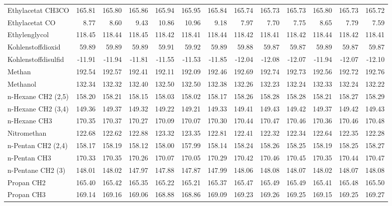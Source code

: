 \begin{table}[ht!]
{\begin{tabular}{lrrrrrrrrrrrr}
    Ethylacetat CH3CO & 165.81 & 165.80 & 165.86 & 165.94 & 165.95 & 165.84 & 165.74 & 165.73 & 165.73 & 165.80 & 165.73 & 165.72 \\
    Ethylacetat CO & 8.77  & 8.60  & 9.43  & 10.86 & 10.96 & 9.18  & 7.97  & 7.70  & 7.75  & 8.65  & 7.79  & 7.59 \\
    Ethylenglycol & 118.45 & 118.44 & 118.45 & 118.42 & 118.41 & 118.44 & 118.42 & 118.41 & 118.42 & 118.44 & 118.42 & 118.41 \\
    Kohlenstoffdioxid & 59.89 & 59.89 & 59.89 & 59.91 & 59.92 & 59.89 & 59.88 & 59.87 & 59.87 & 59.89 & 59.87 & 59.87 \\
    Kohlenstoffdisulfid & -11.91 & -11.94 & -11.81 & -11.55 & -11.53 & -11.85 & -12.04 & -12.08 & -12.07 & -11.94 & -12.07 & -12.10 \\
    Methan & 192.54 & 192.57 & 192.41 & 192.11 & 192.09 & 192.46 & 192.69 & 192.74 & 192.73 & 192.56 & 192.72 & 192.76 \\
    Methanol & 132.34 & 132.32 & 132.40 & 132.50 & 132.50 & 132.38 & 132.26 & 132.23 & 132.24 & 132.33 & 132.24 & 132.22 \\
    n-Hexane CH2 (2,5) & 158.20 & 158.21 & 158.15 & 158.03 & 158.02 & 158.17 & 158.26 & 158.28 & 158.28 & 158.21 & 158.27 & 158.29 \\
    n-Hexane CH2 (3,4) & 149.36 & 149.37 & 149.32 & 149.22 & 149.21 & 149.33 & 149.41 & 149.43 & 149.42 & 149.37 & 149.42 & 149.43 \\
    n-Hexane CH3 & 170.35 & 170.37 & 170.27 & 170.09 & 170.07 & 170.30 & 170.44 & 170.47 & 170.46 & 170.36 & 170.46 & 170.48 \\
    Nitromethan & 122.68 & 122.62 & 122.88 & 123.32 & 123.35 & 122.81 & 122.41 & 122.32 & 122.34 & 122.64 & 122.35 & 122.28 \\
    n-Pentan CH2 (2,4) & 158.17 & 158.19 & 158.12 & 158.00 & 157.99 & 158.14 & 158.24 & 158.26 & 158.25 & 158.19 & 158.25 & 158.27 \\
    n-Pentan CH3 & 170.33 & 170.35 & 170.26 & 170.07 & 170.05 & 170.29 & 170.42 & 170.46 & 170.45 & 170.35 & 170.44 & 170.47 \\
    n-Pentane CH2 (3)  & 148.01 & 148.02 & 147.97 & 147.88 & 147.87 & 147.99 & 148.06 & 148.08 & 148.07 & 148.02 & 148.07 & 148.08 \\
    Propan CH2 & 165.40 & 165.42 & 165.35 & 165.22 & 165.21 & 165.37 & 165.47 & 165.49 & 165.49 & 165.41 & 165.48 & 165.50 \\
    Propan CH3 & 169.14 & 169.16 & 169.06 & 168.88 & 168.86 & 169.09 & 169.23 & 169.26 & 169.25 & 169.15 & 169.25 & 169.27 \\

\end{tabular}}
\end{table}
